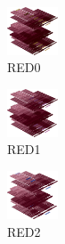 \hspace{0.1cm}
\begin{minipage}[b]{0.15\linewidth}
\begin{figure}[H]                                                          
  \centering                                                             
  \begin{adjustbox}{width=1.5cm,center}                                   
  \includegraphics[width=1.5cm]{src/colorspace_colourflow/flows/colourflow_64-45.png}%
  \end{adjustbox}                                                        
\caption*{RED0}                                           
\end{figure}                                                               
\end{minipage}
\hspace{0.1cm}
\begin{minipage}[b]{0.15\linewidth}
\begin{figure}[H]                                                          
  \centering                                                             
  \begin{adjustbox}{width=1.5cm,center}                                   
  \includegraphics[width=1.5cm]{src/colorspace_colourflow/flows/colourflow_65-45.png}%
  \end{adjustbox}                                                        
\caption*{RED1}                                           
\end{figure}                                                               
\end{minipage}
\hspace{0.1cm}
\begin{minipage}[b]{0.15\linewidth}
\begin{figure}[H]                                                          
  \centering                                                             
  \begin{adjustbox}{width=1.5cm,center}                                   
  \includegraphics[width=1.5cm]{src/colorspace_colourflow/flows/colourflow_66-45.png}%
  \end{adjustbox}                                                        
\caption*{RED2}                                           
\end{figure}                                                               
\end{minipage}

